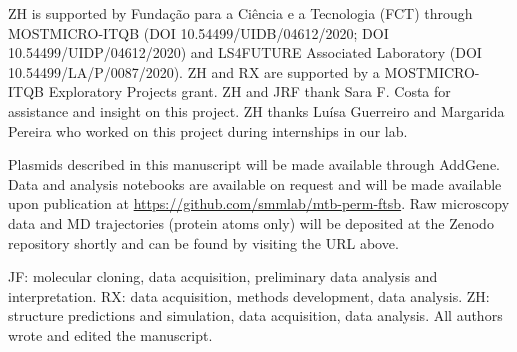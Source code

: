 \documentclass[pdflatex,sn-nature]{sn-jnl}%
\begin{document}
\backmatter


ZH is supported by Fundação para a Ciência e a Tecnologia (FCT) through MOSTMICRO-ITQB (DOI 10.54499/UIDB/04612/2020; DOI 10.54499/UIDP/04612/2020) and LS4FUTURE Associated Laboratory (DOI 10.54499/LA/P/0087/2020).
ZH and RX are supported by a MOSTMICRO-ITQB Exploratory Projects grant.
ZH and JRF thank Sara F. Costa for assistance and insight on this project.
ZH thanks Luísa Guerreiro and Margarida Pereira who worked on this project during internships in our lab.


Plasmids described in this manuscript will be made available through AddGene.
Data and analysis notebooks are available on request and will be made available upon publication at \url{https://github.com/smmlab/mtb-perm-ftsb}.
Raw microscopy data and MD trajectories (protein atoms only) will be deposited at the Zenodo repository shortly and can be found by visiting the URL above.


JF: molecular cloning, data acquisition, preliminary data analysis and interpretation. RX: data acquisition, methods development, data analysis. ZH: structure predictions and simulation, data acquisition, data analysis. All authors wrote and edited the manuscript.


\onecolumn
\end{document}

